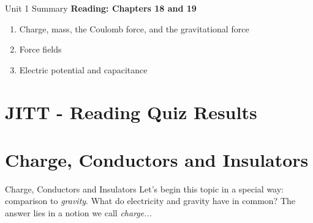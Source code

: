 \documentclass{beamer}
\begin{document}
\begin{frame}{Unit 1 Summary}
\textbf{Reading: Chapters 18 and 19}
\begin{enumerate}
\item Charge, mass, the Coulomb force, and the gravitational force
\item Force fields
\item Electric potential and capacitance
\end{enumerate}
\end{frame}

\section{JITT - Reading Quiz Results}

\section{Charge, Conductors and Insulators}

\begin{frame}{Charge, Conductors and Insulators}
Let's begin this topic in a special way: comparison to \textit{gravity}.  What do electricity and gravity have in common?  The answer lies in a notion we call \textit{charge...}
\end{frame}
\end{document}
